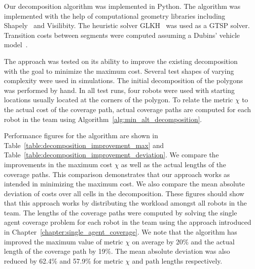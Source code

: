 \documentclass[../main.tex]{subfiles}
\begin{document}
Our decomposition algorithm was implemented in Python. The algorithm was implemented with the help of computational geometry libraries including Shapely~\cite{Shapely:13} and Visilibity\cite{VisiLibity:08}. The heuristic solver GLKH~\cite{helsgaun2000effective} was used as a GTSP solver. Transition costs between segments were computed assuming a Dubins' vehicle model~\cite{dubins1957curves}.

The approach was tested on its ability to improve the existing decomposition with the goal to minimize the maximum cost. Several test shapes of varying complexity were used in simulations. The initial decomposition of the polygons was performed by hand. In all test runs, four robots were used with starting locations usually located at the corners of the polygon. To relate the metric $\chi$ to the actual cost of the coverage path, actual coverage paths are computed for each robot in the team using Algorithm~\ref{alg:min_alt_decomposition}.

Performance figures for the algorithm are shown in Table~\ref{table:decomposition_improvement_max} and Table~\ref{table:decomposition_improvement_deviation}. We compare the improvements in the maximum cost $\chi$ as well as the actual lengths of the coverage paths. This comparison demonstrates that our approach works as intended in minimizing the maximum cost. We also compare the mean absolute deviation of costs over all cells in the decomposition. These figures should show that this approach works by distributing the workload amongst all robots in the team. The lengths of the coverage paths were computed by solving the single agent coverage problem for each robot in the team using the approach introduced in Chapter~\ref{chapter:single_agent_coverage}. We note that the algorithm has improved the maximum value of metric $\chi$ on average by 20\% and the actual length of the coverage path by 19\%. The mean absolute deviation was also reduced by 62.4\% and 57.9\% for metric $\chi$ and path lengths respectively.
\end{document}
